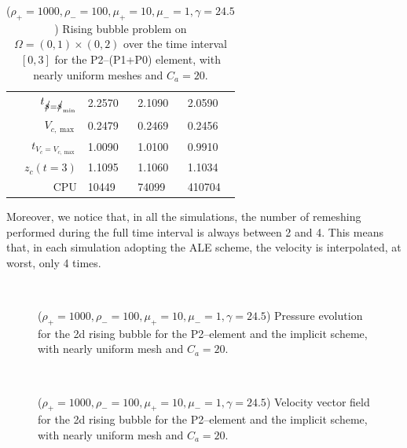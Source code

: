 \begin{table}
\begin{tabular}{rlll}
$t_{\strikes = \strikes_{\min}}$ & 2.2570 & 2.1090 & 2.0590 \\
$V_{c,\max}$                     & 0.2479 & 0.2469 & 0.2456 \\
$t_{V_c = V_{c,\max}}$           & 1.0090 & 1.0100 & 0.9910 \\
$z_c(t=3)$                       & 1.1095 & 1.1060 & 1.1034 \\
CPU                              &  10449 &  74099 & 410704 \\
\hline
\end{tabular}
\hspace*{-3.25cm}
\caption[Navier--Stokes 2d rising bubble benchmark values P2--(P1+P0)]
{($\rho_+ = 1000,\rho_- = 100,\mu_+ = 10,\mu_- =1,\gamma = 24.5$)
Rising bubble problem on ${\Omega = (0,1) \times (0,2)}$ over the time interval
$[0,3]$ for the P2--(P1+P0) element, with nearly uniform meshes and
$C_a=20$\textdegree.}
\label{tab:risingbubble2Dp2p1p0}
\end{table}

Moreover, we notice that, in all the simulations, the number of remeshing
performed during the full time interval is always between 2 and 4. This means
that, in each simulation adopting the ALE scheme, the velocity is interpolated,
at worst, only 4 times.

\begin{figure}[htbp]
\centering
{}
\\
\caption[Navier--Stokes 2d rising bubble pressure]
{($\rho_+ = 1000,\rho_- = 100,\mu_+ = 10,\mu_- =1,\gamma = 24.5$)
Pressure evolution for the 2d rising bubble for the P2--\pdg element and the
implicit scheme, with nearly uniform mesh and $C_a=20$\textdegree.}
\label{fig:rising_bubble_2d_pressure}
\end{figure}

\begin{figure}[htbp]
\centering
{}
\\
\caption[Navier--Stokes 2d rising bubble velocity]
{($\rho_+ = 1000,\rho_- = 100,\mu_+ = 10,\mu_- =1,\gamma = 24.5$)
Velocity vector field for the 2d rising bubble for the P2--\pdg element and
the implicit scheme, with nearly uniform mesh and $C_a=20$\textdegree.}
\label{fig:rising_bubble_2d_velocity}
\end{figure}

